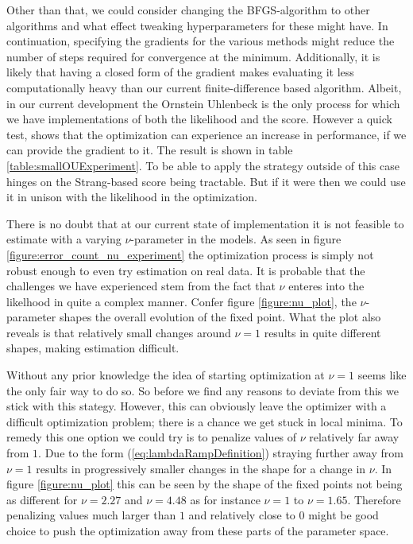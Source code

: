 Other than that, we could consider changing the BFGS-algorithm to other algorithms and what effect tweaking hyperparameters for these might have. In continuation, specifying the gradients for the various methods might reduce the number of steps required for convergence at the minimum. Additionally, it is likely that having a closed form of the gradient makes evaluating it less computationally heavy than our current finite-difference based algorithm. Albeit, in our current development the Ornstein Uhlenbeck is the only process for which we have implementations of both the likelihood and the score. However a quick test, shows that the optimization can experience an increase in performance, if we can provide the gradient to it. The result is shown in table \ref{table:smallOUExperiment}. To be able to apply the strategy outside of this case hinges on the Strang-based score being tractable. But if it were then we could use it in unison with the likelihood in the optimization.

 There is no doubt that at our current state of implementation it is not feasible to estimate with a varying $\nu$-parameter in the models. As seen in figure \ref{figure:error_count_nu_experiment} the optimization process is simply not robust enough to even try estimation on real data. It is probable that the challenges we have experienced stem from the fact that $\nu$ enteres into the likelhood in quite a complex manner. Confer figure \ref{figure:nu_plot}, the $\nu$-parameter shapes the overall evolution of the fixed point. What the plot also reveals is that relatively small changes around $\nu = 1$ results in quite different shapes, making estimation difficult.
 
 Without any prior knowledge the idea of starting optimization at $\nu = 1$ seems like the only fair way to do so. So before we find any reasons to deviate from this we stick with this stategy. However, this can obviously leave the optimizer with a difficult optimization problem; there is a chance we get stuck in local minima. To remedy this one option we could try is to penalize values of $\nu$ relatively far away from $1$. Due to the form (\ref{eq:lambdaRampDefinition}) straying further away from $\nu = 1$ results in progressively smaller changes in the shape for a change in $\nu$. In figure \ref{figure:nu_plot} this can be seen by the shape of the fixed points not being as different for $\nu = 2.27$ and $\nu = 4.48$ as for instance $\nu = 1$ to $\nu = 1.65$. Therefore penalizing values much larger than $1$ and relatively close to $0$ might be good choice to push the optimization away from these parts of the parameter space. 

